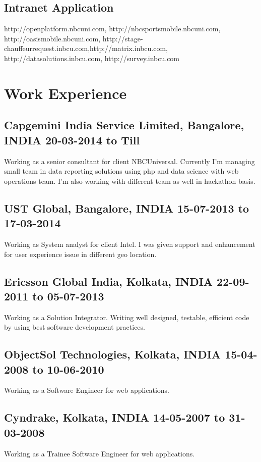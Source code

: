 \documentclass{article}
\begin{document}
\subsection{Intranet Application}
http://openplatform.nbcuni.com, http://nbcsportsmobile.nbcuni.com, http://oasismobile.nbcuni.com, http://stage-chauffeurrequest.inbcu.com,http://matrix.inbcu.com, http://datasolutions.inbcu.com, http://survey.inbcu.com

\section{Work Experience}
\subsection{Capgemini India Service Limited, \textnormal{\small{Bangalore, INDIA \hfill \textbf{20-03-2014 to Till}}}}
Working as a senior consultant for client NBCUniversal. Currently I'm managing small team in data reporting solutions using php and data science with web operations team. I'm also working with different team as well in hackathon basis.
\subsection{UST Global, \textnormal{\small{Bangalore, INDIA \hfill \textbf{15-07-2013 to 17-03-2014}}}}
Working as System analyst for client Intel. I was given support and enhancement for user experience issue in different geo location.
\subsection{Ericsson Global India, \textnormal{\small{Kolkata, INDIA \hfill \textbf{22-09-2011 to 05-07-2013}}}}
Working as a Solution Integrator. Writing well designed, testable, efficient code by using best software development practices.
\subsection{ObjectSol Technologies, \textnormal{\small{Kolkata, INDIA \hfill \textbf{15-04-2008 to 10-06-2010}}}}
Working as a Software Engineer for web applications.
\subsection{Cyndrake, \textnormal{\small{Kolkata, INDIA \hfill \textbf{14-05-2007 to 31-03-2008}}}}
Working as a Trainee Software Engineer for web applications.
\end{document}

